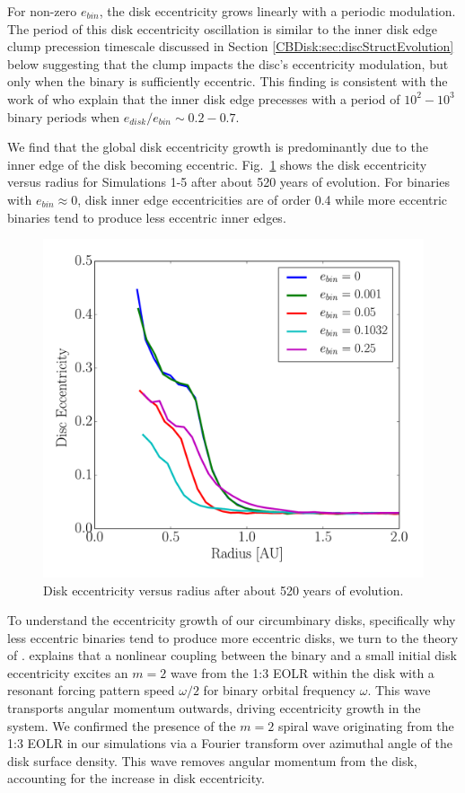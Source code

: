 For non-zero $e_{bin}$, the disk eccentricity grows linearly with a
periodic modulation.  The period of this disk eccentricity oscillation
is similar to the inner disk edge clump precession timescale discussed
in Section \ref{CBDisk:sec:discStructEvolution} below suggesting that the clump impacts the disc's eccentricity modulation, but only when the binary is sufficiently eccentric.  This finding is consistent with the work of \citet{Artymowicz2000} who explain that the inner disk edge precesses with a period of $10^2 - 10^3$ binary periods when $e_{disk}/e_{bin} \sim 0.2-0.7$.  

We find that the global disk eccentricity growth is predominantly due to the inner edge of the disk becoming eccentric.  Fig.~\ref{fig:CBDiskDiskEccRad} shows the disk eccentricity versus radius for Simulations 1-5 after about 520 years of evolution.  For binaries with $e_{bin} \approx 0$, disk inner edge eccentricities are of order 0.4 while more eccentric binaries tend to produce less eccentric inner edges.

\begin{figure}
	\includegraphics[width=\columnwidth]{f3}
    \caption{Disk eccentricity versus radius after about 520 years of evolution.}
    \label{fig:CBDiskDiskEccRad}
\end{figure}

To understand the eccentricity growth of our circumbinary disks,
specifically why less eccentric binaries tend to produce more
eccentric disks, we turn to the theory of \citet{Papaloizou2001}.
\citet{Papaloizou2001} explains that a nonlinear coupling between the
binary and a small initial disk eccentricity excites an $m = 2$ wave
from the 1:3 EOLR within the disk with a resonant forcing pattern
speed $\omega/2$ for binary orbital frequency $\omega$.  This wave
transports angular momentum outwards, driving eccentricity growth in
the system.  We confirmed the presence of the $m = 2$ spiral wave
originating from the 1:3 EOLR in our simulations via a Fourier transform over azimuthal
angle of the disk surface density.  This wave removes angular momentum from the disk, accounting for the increase in disk eccentricity.  


